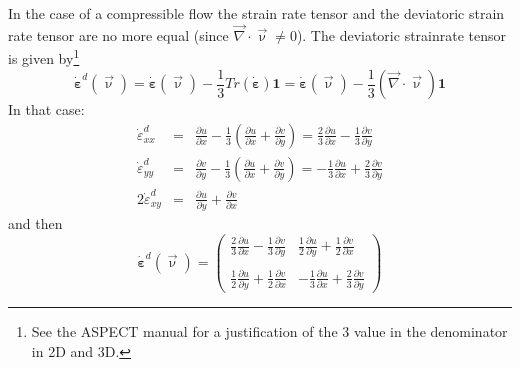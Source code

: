 In the case of a compressible flow the strain rate tensor and the deviatoric strain rate tensor are no more equal (since ${\vec \nabla}\cdot{\vec\upnu} \neq 0$).
The deviatoric strainrate tensor is given by\footnote{See the ASPECT manual for a justification of the 3 value in the denominator in 2D and 3D.} 
\[
\dot{\bm \varepsilon}^d({\vec \upnu})=
\dot{\bm \varepsilon}({\vec \upnu})-\frac{1}{3} Tr(\dot{\bm \varepsilon}) {\bm 1}
=\dot{\bm \varepsilon}({\vec\upnu})-\frac{1}{3} ({\vec \nabla}\cdot{\vec\upnu}) {\bm 1}
\]
In that case:
\begin{eqnarray}
\dot{\varepsilon}_{xx}^d 
&=& \frac{\partial u}{\partial x}
-\frac{1}{3} \left( \frac{\partial u}{\partial x} + \frac{\partial v}{\partial y} \right) 
= \frac{2}{3}\frac{\partial u}{\partial x}
-\frac{1}{3} \frac{\partial v}{\partial y}
\\
\dot{\varepsilon}_{yy}^d 
&=& \frac{\partial v}{\partial y}
-\frac{1}{3} \left( \frac{\partial u}{\partial x} + \frac{\partial v}{\partial y} \right) 
=-\frac{1}{3} \frac{\partial u}{\partial x} 
+ \frac{2}{3} \frac{\partial v}{\partial y} 
\\
2\dot{\varepsilon}_{xy}^d 
&=& 
\frac{\partial u}{\partial y} 
+\frac{\partial v}{\partial x} 
\end{eqnarray}
and then 
\[
\dot{\bm \varepsilon}^d({\vec\upnu})
=
\left(
\begin{array}{cc}
\frac{2}{3} \frac{\partial u}{\partial x} -\frac{1}{3} \frac{\partial v}{\partial y} &
\frac{1}{2}\frac{\partial u}{\partial y} + \frac{1}{2}\frac{\partial v}{\partial x}  \\ \\
\frac{1}{2}\frac{\partial u}{\partial y} + \frac{1}{2}\frac{\partial v}{\partial x}  &
-\frac{1}{3} \frac{\partial u}{\partial x} +\frac{2}{3} \frac{\partial v}{\partial y} 
\end{array}
\right)
\]


